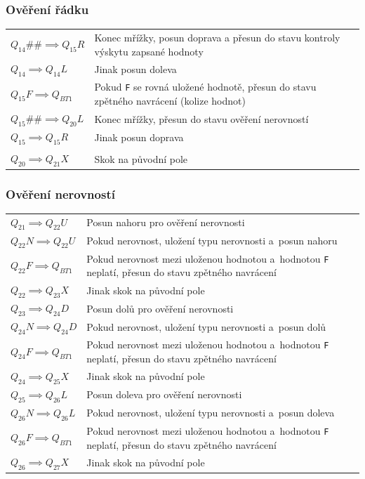 \subsubsection*{Ověření řádku}
\begin{tabular}{@{}p{4cm} p{10.5cm}@{}}
    \(Q_{14}\#\# \implies Q_{15}R\) & Konec mřížky, posun doprava a přesun do
        stavu kontroly výskytu zapsané hodnoty \\
    \(Q_{14} \implies Q_{14}L\) & Jinak posun doleva \\
    \(Q_{15}F \implies Q_{BT1}\) & Pokud \texttt{F} se rovná uložené hodnotě,
        přesun do stavu zpětného navrácení (kolize hodnot) \\
    \(Q_{15}\#\# \implies Q_{20}L\) & Konec mřížky, přesun do stavu ověření
        nerovností \\
    \(Q_{15} \implies Q_{15}R\) & Jinak posun doprava \\

    & \\
    \(Q_{20} \implies Q_{21}X\) & Skok na původní pole \\
\end{tabular}

\subsubsection*{Ověření nerovností}
\begin{tabular}{@{}p{4cm} p{10.5cm}@{}}
    \(Q_{21} \implies Q_{22}U\) & Posun nahoru pro ověření nerovnosti \\
    \(Q_{22}N \implies Q_{22}U\) & Pokud nerovnost, uložení typu nerovnosti
        a~posun nahoru \\
    \(Q_{22}F \implies Q_{BT1}\) & Pokud nerovnost mezi uloženou hodnotou
        a~hodnotou \texttt{F} neplatí, přesun do stavu zpětného navrácení \\
    \(Q_{22} \implies Q_{23}X\) & Jinak skok na původní pole \\

    \(Q_{23} \implies Q_{24}D\) & Posun dolů pro ověření nerovnosti \\
    \(Q_{24}N \implies Q_{24}D\) & Pokud nerovnost, uložení typu nerovnosti
        a~posun dolů \\
    \(Q_{24}F \implies Q_{BT1}\) & Pokud nerovnost mezi uloženou hodnotou
        a~hodnotou \texttt{F} neplatí, přesun do stavu zpětného navrácení \\
    \(Q_{24} \implies Q_{25}X\) & Jinak skok na původní pole \\

    \(Q_{25} \implies Q_{26}L\) & Posun doleva pro ověření nerovnosti \\
    \(Q_{26}N \implies Q_{26}L\) & Pokud nerovnost, uložení typu nerovnosti
        a~posun doleva \\
    \(Q_{26}F \implies Q_{BT1}\) & Pokud nerovnost mezi uloženou hodnotou
        a~hodnotou \texttt{F} neplatí, přesun do stavu zpětného navrácení \\
    \(Q_{26} \implies Q_{27}X\) & Jinak skok na původní pole \\
\end{tabular}

